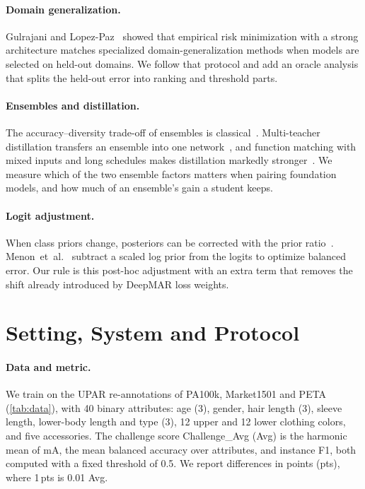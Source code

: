 \documentclass[10pt,twocolumn,letterpaper]{article}
\newcommand{\pts}{\,pts}
\newcommand{\etal}{et~al.}
\begin{document}
\paragraph{Domain generalization.} Gulrajani and Lopez-Paz~\cite{domainbed} showed that empirical risk minimization with a strong architecture matches specialized domain-generalization methods when models are selected on held-out domains. We follow that protocol and add an oracle analysis that splits the held-out error into ranking and threshold parts.

\paragraph{Ensembles and distillation.} The accuracy--diversity trade-off of ensembles is classical~\cite{krogh,kuncheva}. Multi-teacher distillation transfers an ensemble into one network~\cite{hinton,radio}, and function matching with mixed inputs and long schedules makes distillation markedly stronger~\cite{patient}. We measure which of the two ensemble factors matters when pairing foundation models, and how much of an ensemble's gain a student keeps.

\paragraph{Logit adjustment.} When class priors change, posteriors can be corrected with the prior ratio~\cite{saerens,lipton}. Menon~\etal~\cite{logitadj} subtract a scaled log prior from the logits to optimize balanced error. Our rule is this post-hoc adjustment with an extra term that removes the shift already introduced by DeepMAR loss weights.

\section{Setting, System and Protocol}
\label{sec:setting}

\paragraph{Data and metric.} We train on the UPAR re-annotations of PA100k, Market1501 and PETA (\cref{tab:data}), with 40 binary attributes: age (3), gender, hair length (3), sleeve length, lower-body length and type (3), 12 upper and 12 lower clothing colors, and five accessories. The challenge score Challenge\_Avg (Avg) is the harmonic mean of mA, the mean balanced accuracy over attributes, and instance F1, both computed with a fixed threshold of 0.5. We report differences in points (pts), where 1\pts{} is 0.01 Avg.
\end{document}
